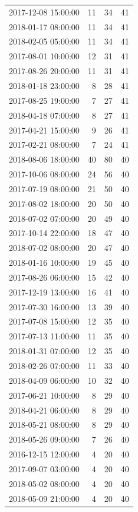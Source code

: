 \begin{tabular}{lrrr}
2017-12-08 15:00:00 & 11 & 34 & 41 \\
2018-01-17 08:00:00 & 11 & 34 & 41 \\
2018-02-05 05:00:00 & 11 & 34 & 41 \\
2017-08-01 10:00:00 & 12 & 31 & 41 \\
2017-08-26 20:00:00 & 11 & 31 & 41 \\
2018-01-18 23:00:00 & 8 & 28 & 41 \\
2017-08-25 19:00:00 & 7 & 27 & 41 \\
2018-04-18 07:00:00 & 8 & 27 & 41 \\
2017-04-21 15:00:00 & 9 & 26 & 41 \\
2017-02-21 08:00:00 & 7 & 24 & 41 \\
2018-08-06 18:00:00 & 40 & 80 & 40 \\
2017-10-06 08:00:00 & 24 & 56 & 40 \\
2017-07-19 08:00:00 & 21 & 50 & 40 \\
2017-08-02 18:00:00 & 20 & 50 & 40 \\
2018-07-02 07:00:00 & 20 & 49 & 40 \\
2017-10-14 22:00:00 & 18 & 47 & 40 \\
2018-07-02 08:00:00 & 20 & 47 & 40 \\
2018-01-16 10:00:00 & 19 & 45 & 40 \\
2017-08-26 06:00:00 & 15 & 42 & 40 \\
2017-12-19 13:00:00 & 16 & 41 & 40 \\
2017-07-30 16:00:00 & 13 & 39 & 40 \\
2017-07-08 15:00:00 & 12 & 35 & 40 \\
2017-07-13 11:00:00 & 11 & 35 & 40 \\
2018-01-31 07:00:00 & 12 & 35 & 40 \\
2018-02-26 07:00:00 & 11 & 33 & 40 \\
2018-04-09 06:00:00 & 10 & 32 & 40 \\
2017-06-21 10:00:00 & 8 & 29 & 40 \\
2018-04-21 06:00:00 & 8 & 29 & 40 \\
2018-05-21 08:00:00 & 8 & 29 & 40 \\
2018-05-26 09:00:00 & 7 & 26 & 40 \\
2016-12-15 12:00:00 & 4 & 20 & 40 \\
2017-09-07 03:00:00 & 4 & 20 & 40 \\
2018-05-02 08:00:00 & 4 & 20 & 40 \\
2018-05-09 21:00:00 & 4 & 20 & 40 \\

\end{tabular}
